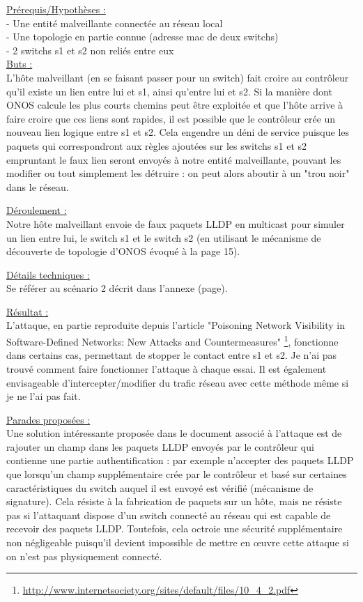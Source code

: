 \underline{Prérequis/Hypothèses :}\\
- Une entité malveillante connectée au réseau local\\
- Une topologie en partie connue (adresse mac de deux switchs)\\
- 2 switchs s1 et s2 non reliés entre eux\\


\underline{Buts :}\\
L’hôte malveillant (en se faisant passer pour un switch) fait croire au contrôleur qu’il existe un lien entre lui et s1, ainsi qu’entre lui et s2. Si la manière dont ONOS calcule les plus courts chemins peut être exploitée et que l'hôte arrive à faire croire que ces liens sont rapides, il est possible que le contrôleur crée un nouveau lien logique entre s1 et s2. Cela engendre un déni de service puisque les paquets qui correspondront aux règles ajoutées sur les switchs s1 et s2 empruntant le faux lien seront envoyés à notre entité malveillante, pouvant les modifier ou tout simplement les détruire : on peut alors aboutir à un "trou noir" dans le réseau.

\underline{Déroulement :}\\
Notre hôte malveillant envoie de faux paquets LLDP en multicast pour simuler un lien entre lui, le switch s1 et le switch s2 (en utilisant le mécanisme de découverte de topologie d'ONOS évoqué à la page 15).

\underline{Détails techniques :}\\
Se référer au scénario 2 décrit dans l'annexe (page).

\underline{Résultat :}\\
L'attaque, en partie reproduite depuis l'article "Poisoning Network Visibility in Software-Defined Networks: New Attacks and Countermeasures" \footnote{\url{http://www.internetsociety.org/sites/default/files/10_4_2.pdf}}, fonctionne dans certains cas, permettant de stopper le contact entre s1 et s2. Je n'ai pas trouvé comment faire fonctionner l'attaque à chaque essai. Il est également envisageable d'intercepter/modifier du trafic réseau avec cette méthode même si je ne l'ai pas fait.

\underline{Parades proposées :}\\
Une solution intéressante proposée dans le document associé à l’attaque est de rajouter un champ dans les paquets LLDP envoyés par le contrôleur qui contienne une partie authentification : par exemple n’accepter des paquets LLDP que lorsqu’un champ supplémentaire crée par le contrôleur et basé sur certaines caractéristiques du switch auquel il est envoyé est vérifié (mécanisme de signature). Cela résiste à la fabrication de paquets sur un hôte, mais ne résiste pas si l’attaquant dispose d’un switch connecté au réseau qui est capable de recevoir des paquets LLDP. Toutefois, cela octroie une sécurité supplémentaire non négligeable puisqu’il devient impossible de mettre en œuvre cette attaque si on n’est pas physiquement connecté.

